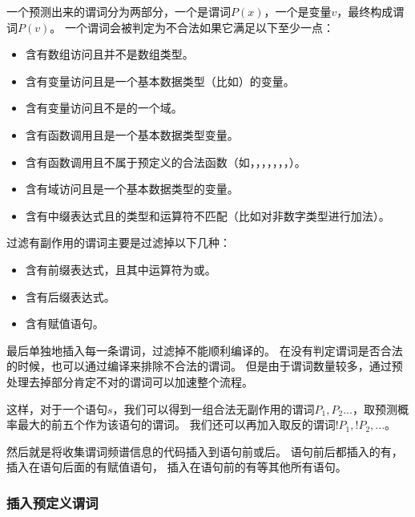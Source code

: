 一个预测出来的谓词分为两部分，一个是谓词$P(x)$，一个是变量$v$，最终构成谓词$P(v)$。
一个谓词会被判定为不合法如果它满足以下至少一点：
\begin{itemize}
\item 含有数组访问且并不是数组类型。
\item 含有变量访问且是一个基本数据类型（比如）的变量。
\item 含有变量访问且不是的一个域。
\item 含有函数调用且是一个基本数据类型变量。
\item 含有函数调用且不属于预定义的合法函数（如，，，，，，，）。
\item 含有域访问且是一个基本数据类型的变量。
\item 含有中缀表达式且的类型和运算符不匹配（比如对非数字类型进行加法）。
\end{itemize}

过滤有副作用的谓词主要是过滤掉以下几种：
\begin{itemize}
\item 含有前缀表达式，且其中运算符为\mycode{++}或\mycode{--}。
\item 含有后缀表达式。
\item 含有赋值语句。
\end{itemize}

最后单独地插入每一条谓词，过滤掉不能顺利编译的。
在没有判定谓词是否合法的时候，也可以通过编译来排除不合法的谓词。
但是由于谓词数量较多，通过预处理去掉部分肯定不对的谓词可以加速整个流程。

这样，对于一个语句$s$，我们可以得到一组合法无副作用的谓词${P_1,P_2...}$，取预测概率最大的前五个作为该语句的谓词。
我们还可以再加入取反的谓词${!P_1, !P_2, ...}$。

然后就是将收集谓词频谱信息的代码插入到语句前或后。
语句前后都插入的有，
插入在语句后面的有赋值语句，
插入在语句前的有等其他所有语句。

\subsubsection{插入预定义谓词}

